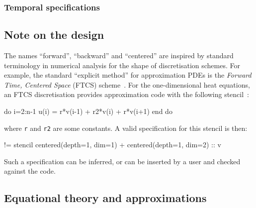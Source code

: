 \documentclass[9pt]{sigplanconf}
\theoremstyle{definition}
\begin{document}
\subsubsection{Temporal specifications}


\subsection{Note on the design}

The names ``forward'', ``backward'' and ``centered''
are inspired by standard terminology in numerical analysis
for the shape of discretisation schemes. For example,
the standard ``explicit method'' for approximation
PDEs is the \emph{Forward Time, Centered Space} (FTCS)
scheme~\cite{dawson1991finite}. For
the one-dimensional heat equations, an FTCS discretisation 
provides approximation code with the following stencil~\cite{recktenwald2004finite}:
\begin{ExmVerbatim}
do i=2:n-1
  u(i) = r*v(i-1) + r2*v(i) + r*v(i+1)
end do
\end{ExmVerbatim}
where \texttt{r} and \texttt{r2} are some constants. 
A valid specification for this stencil is then:
\begin{ExmVerbatim}
!= stencil centered(depth=1, dim=1) 
         + centered(depth=1, dim=2) :: v
\end{ExmVerbatim}
Such a specification can be inferred, or can be inserted by a user
and checked against the code.

\subsection{Equational theory and approximations}
\label{sec:eqs}
\end{document}
